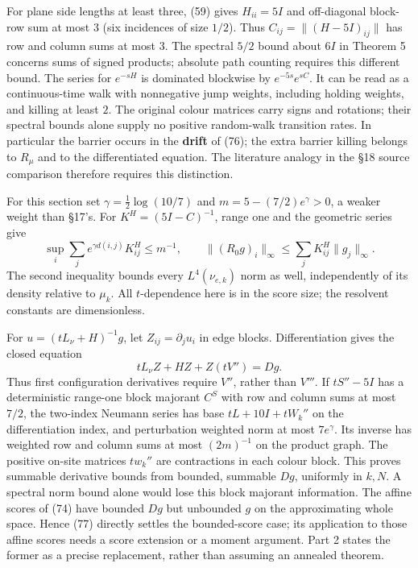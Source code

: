 \documentclass[11pt,a4paper]{article}
\begin{document}
For plane side lengths at least three, (59) gives \(H_{ii}=5I\) and
off-diagonal block-row sum at most \(3\) (six incidences of size
\(1/2\)). Thus \(C_{ij}=\|(H-5I)_{ij}\|\) has row and column sums at
most \(3\). The spectral \(5/2\) bound about \(6I\) in Theorem 5
concerns sums of signed products; absolute path counting requires this
different bound. The series for \(e^{-sH}\) is dominated blockwise by
\(e^{-5s}e^{sC}\). It can be read as a continuous-time walk with
nonnegative jump weights, including holding weights, and killing at
least \(2\). The original colour matrices carry signs and rotations;
their spectral bounds alone supply no positive random-walk transition
rates. In particular the barrier occurs in the \textbf{drift} of (76);
the extra barrier killing belongs to \(R_\mu\) and to the differentiated
equation. The literature analogy in the §18 source comparison therefore
requires this distinction.

For this section set \(\gamma=\frac12\log(10/7)\) and
\(m=5-(7/2)e^\gamma>0\), a weaker weight than §17's. For
\(K^H=(5I-C)^{-1}\), range one and the geometric series give
\[\sup_i\sum_j e^{\gamma d(i,j)}K^H_{ij}\le m^{-1},\qquad
\|(R_0g)_i\|_\infty\le\sum_jK^H_{ij}\|g_j\|_\infty.\tag{77}\] The second
inequality bounds every \(L^4(\nu_{e,k})\) norm as well, independently
of its density relative to \(\mu_k\). All \(t\)-dependence here is in
the score size; the resolvent constants are dimensionless.

For \(u=(tL_\nu+H)^{-1}g\), let \(Z_{ij}=\partial_j u_i\) in edge
blocks. Differentiation gives the closed equation
\[tL_\nu Z+HZ+Z(tV'')=Dg.\tag{78}\] Thus first configuration derivatives
require \(V''\), rather than \(V'''\). If \(tS''-5I\) has a
deterministic range-one block majorant \(C^S\) with row and column sums
at most \(7/2\), the two-index Neumann series has base \(tL+10I+tW_k''\)
on the differentiation index, and perturbation weighted norm at most
\(7e^\gamma\). Its inverse has weighted row and column sums at most
\((2m)^{-1}\) on the product graph. The positive on-site matrices
\(t w_k''\) are contractions in each colour block. This proves summable
derivative bounds from bounded, summable \(Dg\), uniformly in \(k,N\). A
spectral norm bound alone would lose this block majorant information.
The affine scores of (74) have bounded \(Dg\) but unbounded \(g\) on the
approximating whole space. Hence (77) directly settles the bounded-score
case; its application to those affine scores needs a score extension or
a moment argument. Part 2 states the former as a precise replacement,
rather than assuming an annealed theorem.
\end{document}
